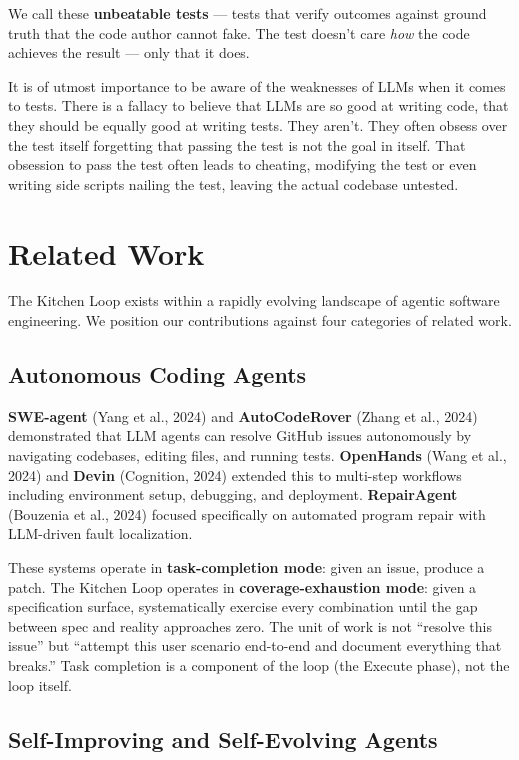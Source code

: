\documentclass[11pt,a4paper]{article}
\begin{document}
We call these \textbf{unbeatable tests} --- tests that verify outcomes against ground truth that the code author cannot fake. The test doesn't care \emph{how} the code achieves the result --- only that it does.

It is of utmost importance to be aware of the weaknesses of LLMs when it comes to tests. There is a fallacy to believe that LLMs are so good at writing code, that they should be equally good at writing tests. They aren't. They often obsess over the test itself forgetting that passing the test is not the goal in itself. That obsession to pass the test often leads to cheating, modifying the test or even writing side scripts nailing the test, leaving the actual codebase untested.


\section{Related Work}\label{sec:related-work}

The Kitchen Loop exists within a rapidly evolving landscape of agentic software engineering. We position our contributions against four categories of related work.

\subsection{Autonomous Coding Agents}\label{sec:autonomous-coding-agents}

\textbf{SWE-agent} (Yang et al., 2024) and \textbf{AutoCodeRover} (Zhang et al., 2024) demonstrated that LLM agents can resolve GitHub issues autonomously by navigating codebases, editing files, and running tests. \textbf{OpenHands} (Wang et al., 2024) and \textbf{Devin} (Cognition, 2024) extended this to multi-step workflows including environment setup, debugging, and deployment. \textbf{RepairAgent} (Bouzenia et al., 2024) focused specifically on automated program repair with LLM-driven fault localization.

These systems operate in \textbf{task-completion mode}: given an issue, produce a patch. The Kitchen Loop operates in \textbf{coverage-exhaustion mode}: given a specification surface, systematically exercise every combination until the gap between spec and reality approaches zero. The unit of work is not ``resolve this issue'' but ``attempt this user scenario end-to-end and document everything that breaks.'' Task completion is a component of the loop (the Execute phase), not the loop itself.

\subsection{Self-Improving and Self-Evolving Agents}\label{sec:self-improving-and-self-evolving-agents}
\end{document}
